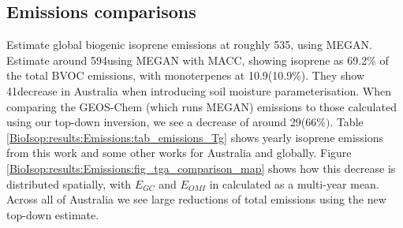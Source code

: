       
      
  \subsection{Emissions comparisons}
    \label{BioIsop:results:Emissions}
    
    \textcite{Guenther2012} Estimate global biogenic isoprene emissions at roughly 535\tgpyr, using MEGAN.
    \textcite{Sindelarova2014} Estimate around 594\tgpyr using MEGAN with MACC, showing isoprene as 69.2\% of the total BVOC emissions, with monoterpenes at 10.9\tgpyr (10.9\%).
    They show 41\tgpyr decrease in Australia when introducing soil moisture parameterisation.
    When comparing the GEOS-Chem (which runs MEGAN) emissions to those calculated using our top-down inversion, we see a decrease of around 29\tgpyr ($66\%)$.
    Table \ref{BioIsop:results:Emissions:tab_emissions_Tg} shows yearly isoprene emissions from this work and some other works for Australia and globally.
    Figure \ref{BioIsop:results:Emissions:fig_tga_comparison_map} shows how this decrease is distributed spatially, with $E_{GC}$ and $E_{OMI}$ in \tgpyr calculated as a multi-year mean.
    Across all of Australia we see large reductions of total emissions using the new top-down estimate.
    
    
    
    
